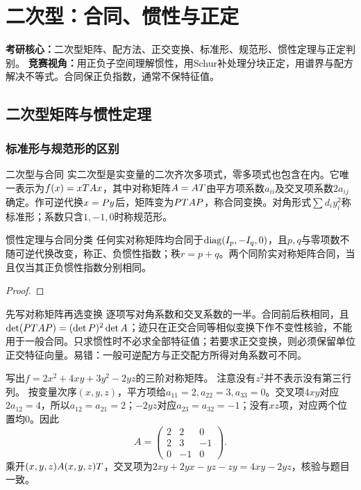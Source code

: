 \chapter{二次型：合同、惯性与正定}\label{ch:quadratic}
\begin{examtip}
\textbf{考研核心：}二次型矩阵、配方法、正交变换、标准形、规范形、惯性定理与正定判别。
\textbf{竞赛视角：}用正负子空间理解惯性，用Schur补处理分块正定，用谱界与配方解决不等式。合同保正负指数，通常不保特征值。
\end{examtip}
\section{二次型矩阵与惯性定理}
\subsection{标准形与规范形的区别}
\begin{definition}{二次型与合同}
实二次型是实变量的二次齐次多项式，零多项式也包含在内。它唯一表示为$f(x)=xT Ax$，其中对称矩阵$A=AT$由平方项系数$a_{ii}$及交叉项系数$2a_{ij}$确定。作可逆代换$x=Py$后，矩阵变为$PT AP$，称合同变换。对角形式$\sum d_i y_i^2$称标准形；系数只含$1,-1,0$时称规范形。
\end{definition}
\begin{theorem}{惯性定理与合同分类}
任何实对称矩阵均合同于$\operatorname{diag}(I_p,-I_q,0)$，且$p,q$与零项数不随可逆代换改变，称正、负惯性指数；秩$r=p+q$。两个同阶实对称矩阵合同，当且仅当其正负惯性指数分别相同。
\end{theorem}
\begin{proof}

\end{proof}
\begin{method}{先写对称矩阵再选变换}
逐项写对角系数和交叉系数的一半。合同前后秩相同，且$\det(PT AP)=(\det P)^2\det A$；迹只在正交合同等相似变换下作不变性核验，不能用于一般合同。只求惯性时不必求全部特征值；若要求正交变换，则必须保留单位正交特征向量。易错：一般可逆配方与正交配方所得对角系数可不同。
\end{method}
{写出$f=2x^2+4xy+3y^2-2yz$的三阶对称矩阵。}
{注意没有$z^2$并不表示没有第三行列。}
{按变量次序$(x,y,z)$，平方项给$a_{11}=2,a_{22}=3,a_{33}=0$。交叉项$4xy$对应$2a_{12}=4$，所以$a_{12}=a_{21}=2$；$-2yz$对应$a_{23}=a_{32}=-1$；没有$xz$项，对应两个位置均0。因此
\[A=\begin{pmatrix}2&2&0\\2&3&-1\\0&-1&0\end{pmatrix}.\]
乘开$(x,y,z)A(x,y,z)T$，交叉项为$2xy+2yx-yz-zy=4xy-2yz$，核验与题目一致。}
